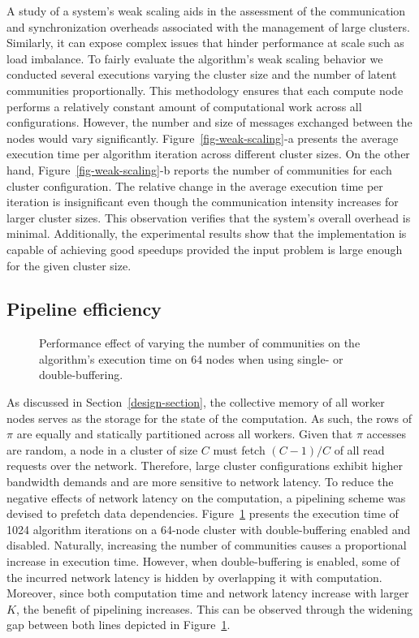 A study of a system's weak scaling aids in the assessment of the communication
and synchronization overheads associated with the management of large clusters.
Similarly, it can expose complex issues that hinder performance at scale such
as load imbalance. To fairly evaluate the algorithm's weak scaling behavior we
conducted several executions varying the cluster size and the number of latent
communities proportionally. This methodology ensures that each compute node
performs a relatively constant amount of computational work across all
configurations. However, the number and size of messages exchanged between the
nodes would vary significantly. Figure~\ref{fig-weak-scaling}-a presents the
average execution
time per algorithm iteration across different cluster sizes. On the other hand,
Figure~\ref{fig-weak-scaling}-b reports the number of communities for each
cluster configuration. The relative change in the average execution time per
iteration is insignificant even though the communication intensity increases
for larger cluster sizes. This observation verifies that the system's overall
overhead is minimal. Additionally, the experimental results show that the
implementation is capable of achieving good speedups provided the input problem
is large enough for the given cluster size.

\subsection{Pipeline efficiency}
\label{eval-pipeline}

\begin{figure}[t] %
  \centering
  \caption{Performance effect of varying the number of communities on the
    algorithm's execution time on 64 nodes when using single- or
    double-buffering.}
  \label{fig-pipeline}
\end{figure}

As discussed in Section~\ref{design-section}, the collective memory of all
worker nodes serves as the storage for the state of the computation. As such,
the rows of $\pi$ are equally and statically partitioned across all workers.
Given that $\pi$ accesses are random, a node in a cluster of size $C$ must
fetch $(C-1)/C$ of all read requests over the network. Therefore, large cluster
configurations exhibit higher bandwidth demands and are more sensitive
to network latency. To reduce the negative effects of network latency on the
computation, a pipelining scheme was devised to prefetch data dependencies.
Figure~\ref{fig-pipeline} presents the execution time of 1024 algorithm
iterations on a 64-node cluster with double-buffering enabled and disabled.
Naturally, increasing the number of communities causes a proportional increase
in execution time. However, when double-buffering is enabled, some of the
incurred network latency is hidden by overlapping it with computation.
Moreover, since both computation time and network latency increase with larger
$K$, the benefit of pipelining increases. This can be observed through the
widening gap between both lines depicted in Figure~\ref{fig-pipeline}.

